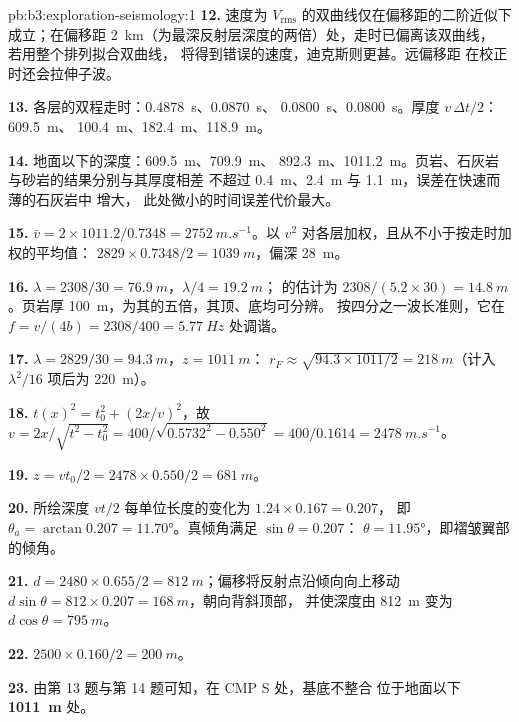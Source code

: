 \begin{solution}{pb:b3:exploration-seismology:1}
\textbf{12.} 速度为 $V_{\text{rms}}$ 的双曲线仅在偏移距的二阶近似下成立；在偏移距
\qty{2}{km}（为最深反射层深度的两倍）处，走时已偏离该双曲线，
若用整个排列拟合双曲线，
将得到错误的速度，迪克斯则更甚。远偏移距
在校正时还会拉伸子波。

\textbf{13.} 各层的双程走时：\qty{0.4878}{s}、\qty{0.0870}{s}、
\qty{0.0800}{s}、\qty{0.0800}{s}。厚度 $v\,\Delta t/2$：\qty{609.5}{m}、
\qty{100.4}{m}、\qty{182.4}{m}、\qty{118.9}{m}。

\textbf{14.} 地面以下的深度：\qty{609.5}{m}、\qty{709.9}{m}、
\qty{892.3}{m}、\qty{1011.2}{m}。页岩、石灰岩与砂岩的结果分别与其厚度相差
不超过 \qty{0.4}{m}、\qty{2.4}{m} 与 \qty{1.1}{m}，误差在快速而薄的石灰岩中
增大，
此处微小的时间误差代价最大。

\textbf{15.} $\bar v = 2\times1011.2/0.7348 = \qty{2752}{m.s^{-1}}$。以 $v^2$ 对各层加权，且从不小于按走时加权的平均值：
$2829\times0.7348/2 = \qty{1039}{m}$，偏深 \qty{28}{m}。

\textbf{16.} $\lambda = 2308/30 = \qty{76.9}{m}$，$\lambda/4 = \qty{19.2}{m}$；
的估计为 $2308/(5.2\times30) = \qty{14.8}{m}$。页岩厚
\qty{100}{m}，为其的五倍，其顶、底均可分辨。
按四分之一波长准则，它在 $f = v/(4b) =
2308/400 = \qty{5.77}{Hz}$ 处调谐。

\textbf{17.} $\lambda = 2829/30 = \qty{94.3}{m}$，$z = \qty{1011}{m}$：
$r_F \approx \sqrt{94.3\times1011/2} = \qty{218}{m}$（计入 $\lambda^2/16$ 项后为
\qty{220}{m}）。

\textbf{18.} $t(x)^2 = t_0^2 + (2x/v)^2$，故 $v = 2x/\sqrt{t^2 - t_0^2} =
400/\sqrt{0.5732^2 - 0.550^2} = 400/0.1614 = \qty{2478}{m.s^{-1}}$。

\textbf{19.} $z = vt_0/2 = 2478\times0.550/2 = \qty{681}{m}$。

\textbf{20.} 所绘深度 $vt/2$ 每单位长度的变化为 $1.24\times0.167 = 0.207$，
即 $\theta_a = \arctan0.207 = \ang{11.70}$。真倾角满足 $\sin\theta = 0.207$：
$\theta = \ang{11.95}$，即褶皱翼部的倾角。

\textbf{21.} $d = 2480\times0.655/2 = \qty{812}{m}$；偏移将反射点沿倾向向上移动
$d\sin\theta = 812\times0.207 = \qty{168}{m}$，朝向背斜顶部，
并使深度由 \qty{812}{m} 变为 $d\cos\theta =
\qty{795}{m}$。

\textbf{22.} $2500\times0.160/2 = \qty{200}{m}$。

\textbf{23.} 由第 13 题与第 14 题可知，在 CMP S 处，基底不整合
位于地面以下 \textbf{\qty[text-series-to-math=true]{1011}{m}} 处。
\end{solution}

